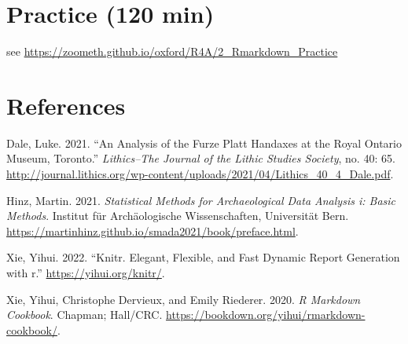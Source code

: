 \documentclass[
]{article}
\newlength{\cslhangindent}
\newlength{\cslentryspacingunit} %
\newenvironment{CSLReferences}[2] %
 {%
  \setlength{\parindent}{0pt}
  \ifodd #1
  \let\oldpar\par
  \def\par{\hangindent=\cslhangindent\oldpar}
  \fi
  \setlength{\parskip}{#2\cslentryspacingunit}
 }%
 {}
\begin{document}
\hypertarget{practice}{%
\section{Practice (120 min)}\label{practice}}

see \url{https://zoometh.github.io/oxford/R4A/2_Rmarkdown_Practice}

\hypertarget{references}{%
\section*{References}\label{references}}

\hypertarget{refs}{}
\begin{CSLReferences}{1}{0}
\leavevmode{}%
Dale, Luke. 2021. {``An Analysis of the Furze Platt Handaxes at the
Royal Ontario Museum, Toronto.''} \emph{Lithics--The Journal of the
Lithic Studies Society}, no. 40: 65.
\url{http://journal.lithics.org/wp-content/uploads/2021/04/Lithics_40_4_Dale.pdf}.

\leavevmode{}%
Hinz, Martin. 2021. \emph{Statistical Methods for Archaeological Data
Analysis i: Basic Methods}. Institut für Archäologische Wissenschaften,
Universität Bern.
\url{https://martinhinz.github.io/smada2021/book/preface.html}.

\leavevmode{}%
Xie, Yihui. 2022. {``Knitr. Elegant, Flexible, and Fast Dynamic Report
Generation with r.''} \url{https://yihui.org/knitr/}.

\leavevmode{}%
Xie, Yihui, Christophe Dervieux, and Emily Riederer. 2020. \emph{R
Markdown Cookbook}. Chapman; Hall/CRC.
\url{https://bookdown.org/yihui/rmarkdown-cookbook/}.

\end{CSLReferences}
\end{document}
